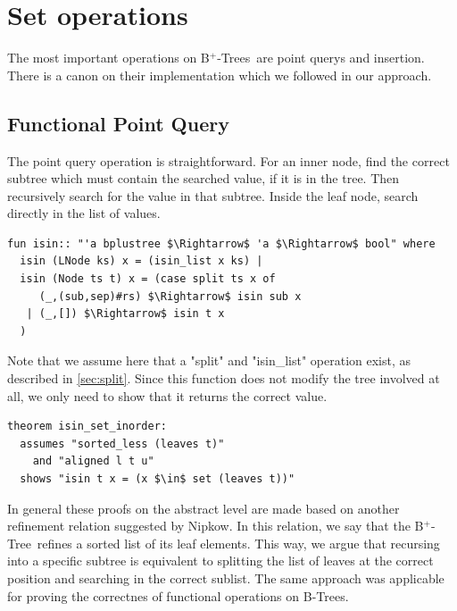 \documentclass[a4paper,UKenglish,cleveref, autoref, thm-restate]{lipics-v2021}
\newcommand{\btree}{B$^+$-Tree}
\newcommand{\btrees}{B$^+$-Trees}
\begin{document}
\section{Set operations}
\label{sec:set}

The most important operations on \btrees\ are point querys and insertion.
There is a canon on their implementation which we followed in our approach.

\subsection{Functional Point Query}
\label{sec:functional_pq}

The point query operation is straightforward.
For an inner node, find the correct subtree which must contain
the searched value, if it is in the tree.
Then recursively search for the value in that subtree.
Inside the leaf node, search directly in the list of values.

\begin{lstlisting}[mathescape=true, language=Isabelle,label=lst:isin-def]
fun isin:: "'a bplustree $\Rightarrow$ 'a $\Rightarrow$ bool" where
  isin (LNode ks) x = (isin_list x ks) |
  isin (Node ts t) x = (case split ts x of
     (_,(sub,sep)#rs) $\Rightarrow$ isin sub x
   | (_,[]) $\Rightarrow$ isin t x
  )
\end{lstlisting}

Note that we assume here that a "split" and "isin\_list" operation exist,
as described in \autoref{sec:split}.
Since this function does not modify the tree involved at all,
we only need to show that it returns the correct value.


\begin{lstlisting}[mathescape=true, language=Isabelle,label=lst:isin-set-inorder]
theorem isin_set_inorder:
  assumes "sorted_less (leaves t)"
    and "aligned l t u"
  shows "isin t x = (x $\in$ set (leaves t))"
\end{lstlisting}

In general these proofs on the abstract level are made
based on another refinement relation suggested by Nipkow. \cite{DBLP:conf/itp/Nipkow16}
In this relation, we say that the \btree\ refines a sorted list of its leaf elements.
This way, we argue that recursing into a specific subtree
is equivalent to splitting the list of leaves at the correct position
and searching in the correct sublist.
The same approach was applicable for proving the correctnes of functional
operations on B-Trees. \cite{DBLP:journals/afp/Mundler21}
\end{document}
